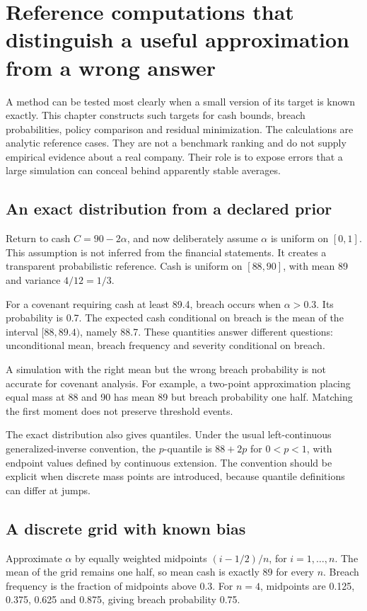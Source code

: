 \chapter[Reference computations and diagnostic experiments]{Reference computations that distinguish a useful approximation from a wrong answer}
\label{sim:computation-cases}

A method can be tested most clearly when a small version of its target is known exactly. This chapter constructs such targets for cash bounds, breach probabilities, policy comparison and residual minimization. The calculations are analytic reference cases. They are not a benchmark ranking and do not supply empirical evidence about a real company. Their role is to expose errors that a large simulation can conceal behind apparently stable averages.

\section{An exact distribution from a declared prior}
Return to cash $C=90-2\alpha$, and now deliberately assume $\alpha$ is uniform on $[0,1]$. This assumption is not inferred from the financial statements. It creates a transparent probabilistic reference. Cash is uniform on $[88,90]$, with mean 89 and variance $4/12=1/3$.

For a covenant requiring cash at least 89.4, breach occurs when $\alpha>0.3$. Its probability is 0.7. The expected cash conditional on breach is the mean of the interval $[88,89.4)$, namely 88.7. These quantities answer different questions: unconditional mean, breach frequency and severity conditional on breach.

A simulation with the right mean but the wrong breach probability is not accurate for covenant analysis. For example, a two-point approximation placing equal mass at 88 and 90 has mean 89 but breach probability one half. Matching the first moment does not preserve threshold events.

The exact distribution also gives quantiles. Under the usual left-continuous generalized-inverse convention, the $p$-quantile is $88+2p$ for $0<p<1$, with endpoint values defined by continuous extension. The convention should be explicit when discrete mass points are introduced, because quantile definitions can differ at jumps.

\section{A discrete grid with known bias}
Approximate $\alpha$ by equally weighted midpoints $(i-1/2)/n$, for $i=1,\ldots,n$. The mean of the grid remains one half, so mean cash is exactly 89 for every $n$. Breach frequency is the fraction of midpoints above 0.3. For $n=4$, midpoints are 0.125, 0.375, 0.625 and 0.875, giving breach probability 0.75.

